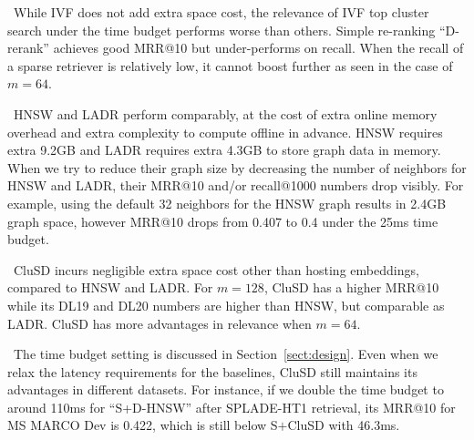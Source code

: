 \textbullet\ While IVF does not add extra space cost,
the relevance  of IVF top cluster search under the time budget performs  worse than others.
Simple re-ranking ``D-rerank'' achieves good MRR@10 but under-performs on recall.
When the recall of a sparse retriever is relatively low, it cannot boost further as seen in the case of $m=64$.

\textbullet\ HNSW and LADR perform comparably, at the cost of extra online memory overhead  and extra complexity to compute offline in advance.
HNSW requires extra 9.2GB and LADR requires extra 4.3GB to store graph data in memory. 
When we  try to reduce their graph size by decreasing  the number of neighbors for HNSW and LADR, their  MRR@10 and/or  recall@1000 numbers drop visibly. For example, 
using the default 32 neighbors for the HNSW graph results in 2.4GB graph space, however  MRR@10 drops from 0.407 to 0.4 under the 25ms time budget. 

\textbullet\ CluSD incurs negligible extra space cost other than hosting embeddings, compared to HNSW and LADR.
For $m=128$,  CluSD has a higher MRR@10 while its DL19 and DL20 numbers are higher than HNSW, but comparable as LADR.
CluSD has more  advantages in relevance when $m=64$. 

\textbullet\ The time budget setting is discussed in Section~\ref{sect:design}.
Even when we relax the latency requirements for the baselines, CluSD still maintains its advantages in different datasets. 
For instance, if we double the time budget to around  110ms
for 	``S+D-HNSW'' after  SPLADE-HT1 retrieval, its MRR@10 for MS MARCO Dev is 0.422, which is still below S$+$CluSD with 46.3ms.




 

